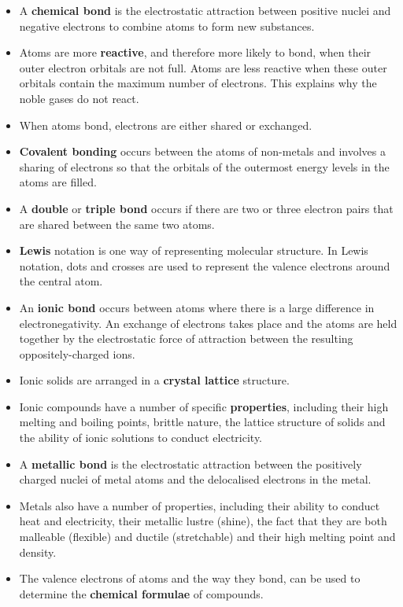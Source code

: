       \label{m38689*id147386}\begin{itemize}[noitemsep]
            \label{m38689*uid136}\item A \textbf{chemical bond} is the electrostatic attraction between positive nuclei and negative electrons to combine atoms to form new substances.
\label{m38689*uid137}\item Atoms are more \textbf{reactive}, and therefore more likely to bond, when their outer electron orbitals are not full. Atoms are less reactive when these outer orbitals contain the maximum number of electrons. This explains why the noble gases do not react.
\label{m38689*uid142}\item When atoms bond, electrons are either shared or exchanged.
\label{m38689*uid143}\item \textbf{Covalent bonding} occurs between the atoms of non-metals and involves a sharing of electrons so that the orbitals of the outermost energy levels in the atoms are filled.
\label{m38689*uid145}\item A \textbf{double} or \textbf{triple bond} occurs if there are two or three electron pairs that are shared between the same two atoms.
\label{m38689*uid147}\item \textbf{Lewis} notation is one way of representing molecular structure. In Lewis notation, dots and crosses are used to represent the valence electrons around the central atom.
\label{m38689*uid150}\item An \textbf{ionic bond} occurs between atoms where there is a large difference in electronegativity. An exchange of electrons takes place and the atoms are held together by the electrostatic force of attraction between the resulting oppositely-charged ions.
\label{m38689*uid151}\item Ionic solids are arranged in a \textbf{crystal lattice} structure.
\label{m38689*uid152}\item Ionic compounds have a number of specific \textbf{properties}, including their high melting and boiling points, brittle nature, the lattice structure of solids and the ability of ionic solutions to conduct electricity.
\label{m38689*uid153}\item A \textbf{metallic bond} is the electrostatic attraction between the positively charged nuclei of metal atoms and the delocalised electrons in the metal.
\label{m38689*uid154}\item Metals also have a number of properties, including their ability to conduct heat and electricity, their metallic lustre (shine), the fact that they are both malleable (flexible) and ductile (stretchable) and their high melting point and density.
\label{m38689*uid155}\item The valence electrons of atoms and the way they bond, can be used to determine the \textbf{chemical formulae} of compounds.
\end{itemize}
